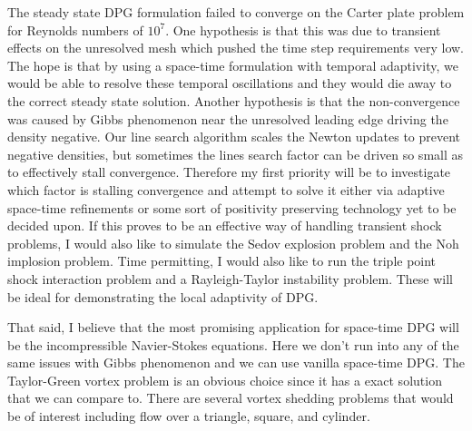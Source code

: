 \documentclass[letterpaper]{article}
\begin{document}
The steady state DPG formulation failed to converge on the Carter plate problem for Reynolds numbers of $10^7$. 
One hypothesis is that this was due to transient effects on the unresolved mesh which pushed the time step requirements very low.
The hope is that by using a space-time formulation with temporal adaptivity, we would be able to resolve these temporal oscillations
and they would die away to the correct steady state solution.
Another hypothesis is that the non-convergence was caused by Gibbs phenomenon near the unresolved leading edge driving the density negative.
Our line search algorithm scales the Newton updates to prevent negative densities, but sometimes the lines search factor can be driven so small
as to effectively stall convergence.
Therefore my first priority will be to investigate which factor is stalling convergence and attempt to solve it either via adaptive space-time
refinements or some sort of positivity preserving technology yet to be decided upon.
If this proves to be an effective way of handling transient shock problems, 
I would also like to simulate the Sedov explosion problem and the Noh implosion problem.
Time permitting, I would also like to run the triple point shock interaction problem and a Rayleigh-Taylor instability problem.
These will be ideal for demonstrating the local adaptivity of DPG.

That said, I believe that the most promising application for space-time DPG will be the incompressible Navier-Stokes equations.
Here we don't run into any of the same issues with Gibbs phenomenon and we can use vanilla space-time DPG.
The Taylor-Green vortex problem is an obvious choice since it has a exact solution that we can compare to.
There are several vortex shedding problems that would be of interest including flow over a triangle, square, and cylinder.




\end{document}
